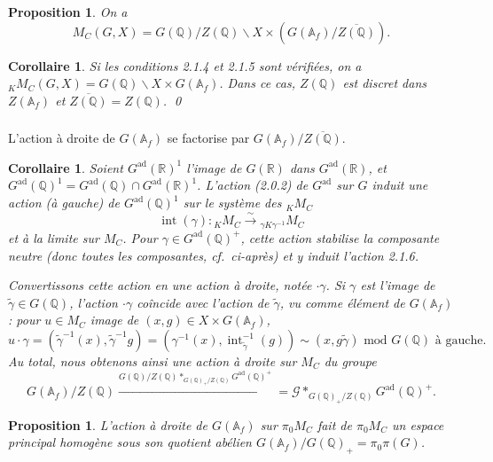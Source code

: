\documentclass[12pt,a4paper]{article}
\theoremstyle{plain}
\newtheorem{proposition}[theorem]{Proposition}
\newtheorem{corollary}[theorem]{Corollaire}
\theoremstyle{definition}
\theoremstyle{remark}
\DeclareMathOperator{\Int}{int}
\newcommand{\QQ}{\mathbb{Q}}
\newcommand{\RR}{\mathbb{R}}
\newcommand{\Af}{\mathbb{A}_f}
\begin{document}
\begin{proposition}
On a
\[
M_C(G,X) = G(\QQ)/Z(\QQ)\backslash X \times (G(\Af)/\overline{Z(\QQ)}).
\]
\end{proposition}

\begin{corollary}
Si les conditions 2.1.4 et 2.1.5 sont v\'erifi\'ees, on a ${}_K M_C(G,X) = G(\QQ)\backslash X \times G(\Af)$. Dans ce cas, $Z(\QQ)$ est discret dans $Z(\Af)$ et $\overline{Z(\QQ)} = Z(\QQ)$.
\qed
\end{corollary}

\subsubsection{}

L'action \`a droite de $G(\Af)$ se factorise par $G(\Af)/\overline{Z(\QQ)}$.

\begin{corollary}
Soient $G^{\text{ad}}(\RR)^1$ l'image de $G(\RR)$ dans $G^{\text{ad}}(\RR)$, et $G^{\text{ad}}(\QQ)^1 = G^{\text{ad}}(\QQ) \cap G^{\text{ad}}(\RR)^1$. L'action (2.0.2) de $G^{\text{ad}}$ sur $G$ induit une action (\`a gauche) de $G^{\text{ad}}(\QQ)^1$ sur le syst\`eme des ${}_K M_C$
\[
\Int(\gamma): {}_K M_C \xrightarrow{\;\sim\;} {}_{\gamma K \gamma^{-1}} M_C
\]
et \`a la limite sur $M_C$. Pour $\gamma \in G^{\text{ad}}(\QQ)^+$, cette action stabilise la composante neutre (donc toutes les composantes, cf.~ci-apr\`es) et y induit l'action 2.1.6.

Convertissons cette action en une action \`a droite, not\'ee $\cdot\gamma$. Si $\gamma$ est l'image de $\tilde{\gamma} \in G(\QQ)$, l'action $\cdot\gamma$ co\^incide avec l'action de $\tilde{\gamma}$, vu comme \'el\'ement de $G(\Af)$: pour $u \in M_C$ image de $(x,g) \in X \times G(\Af)$,
\[
u \cdot \gamma = (\tilde{\gamma}^{-1}(x), \tilde{\gamma}^{-1}g) = (\gamma^{-1}(x), \Int_{\tilde{\gamma}}^{-1}(g)) \sim (x, g\tilde{\gamma}) \text{ mod } G(\QQ) \text{ \`a gauche.}
\]
Au total, nous obtenons ainsi une action \`a droite sur $M_C$ du groupe
\begin{equation}\label{eq:2.1.13.1}
G(\Af)/Z(\QQ) \xrightarrow{G(\QQ)/Z(\QQ) *_{G(\QQ)_+/Z(\QQ)} G^{\text{ad}}(\QQ)^+} = \mathscr{G} *_{G(\QQ)_+/Z(\QQ)} G^{\text{ad}}(\QQ)^+.
\end{equation}
\end{corollary}

\begin{proposition}
L'action \`a droite de $G(\Af)$ sur $\pi_0 M_C$ fait de $\pi_0 M_C$ un espace principal homog\`ene sous son quotient ab\'elien $G(\Af)/G(\QQ)_+ = \pi_0\pi(G)$.
\end{proposition}
\end{document}
